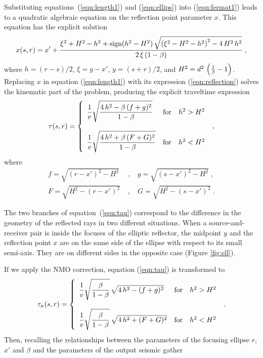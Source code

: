 Substituting equations~(\ref{eqn:length1}) and (\ref{eqn:ellips}) into
(\ref{eqn:fermat1}) leads to a quadratic algebraic equation on the
reflection point parameter $x$.  This equation has the explicit
solution
\begin{equation}
x(s,r)= x' + {{\xi^2+H^2-h^2+\mbox{sign}(h^2-H^2)\,
\sqrt{\left(\xi^2-H^2-h^2\right)^2-4\,H^2\,h^2}\over
{2\,\xi\,(1-\beta)}}}\;,
\label{eqn:reflection}
\end{equation}
where $h=(r-s)/2$, $\xi = y-x'$, $y=(s+r)/2$, and $H^2=d^2\,\left({1
    \over \beta} - 1\right)$. Replacing $x$ in equation
(\ref{eqn:length1}) with its expression (\ref{eqn:reflection}) solves
the kinematic part of the problem, producing the explicit traveltime
expression
\begin{equation}
\tau(s,r)=\left\{
        \begin{array}{lcr}\displaystyle{
{1 \over v} \sqrt{{4\,h^2-\beta\,(f+g)^2} \over {1-\beta}}}
& \mbox{for} & h^2 > H^2 \\ & & \\ \displaystyle{
{1 \over v} \sqrt{{4\,h^2+\beta\,(F+G)^2} \over {1-\beta}}}
& \mbox{for} & h^2 < H^2
        \end{array}
        \right.\;, 
\label{eqn:tau}
\end{equation} 
where 
\begin{eqnarray}
f=\sqrt{(r-x')^2-H^2}\; & , & \;g=\sqrt{(s-x')^2-H^2}\;,
\nonumber \\
F=\sqrt{H^2-(r-x')^2}\; & , & \;G=\sqrt{H^2-(s-x')^2}\;.
\nonumber
\end{eqnarray}

The two branches of equation~(\ref{eqn:tau}) correspond to the
difference in the geometry of the reflected rays in two different
situations. When a source-and-receiver pair is inside the focuses of
the elliptic reflector, the midpoint $y$ and the reflection point $x$
are on the same side of the ellipse with respect to its small
semi-axis. They are on different sides in the opposite case (Figure
\ref{fig:ell}).



If we apply the NMO correction, equation (\ref{eqn:tau}) is transformed to
\begin{equation}
\tau_n(s,r)=\left\{
        \begin{array}{lcr}\displaystyle{
{1 \over v} \sqrt{\beta \over {1-\beta}}\,
\sqrt{4\,h^2-(f+g)^2}}
& \mbox{for} & h^2 > H^2 \\ & & \\ \displaystyle{
{1 \over v} \sqrt{\beta \over {1-\beta}}\,
\sqrt{4\,h^2+(F+G)^2}}
& \mbox{for} & h^2 < H^2
        \end{array}
        \right.\;. 
\label{eqn:taun}
\end{equation}
Then, recalling the relationships between the parameters of the
focusing ellipse $r$, $x'$ and $\beta$ and the parameters of the
output seismic gather \cite[]{GPR29-03-03740406}

